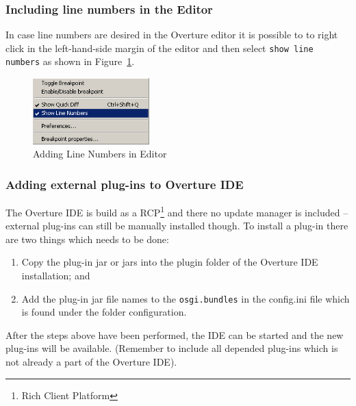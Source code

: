 \documentclass{overturerepsec}
\begin{document}
\subsubsection{Including line numbers in the Editor}

In case line numbers are desired in the Overture
editor it is possible to to right click in the left-hand-side margin
of the editor and then select \texttt{show line numbers} as shown in
Figure~\ref{fig:linenumbers}. 

\begin{figure}[!htb]
\begin{center}
\includegraphics[width=0.4\textwidth]{screenDumps/linenumbers}
\caption{Adding Line Numbers in Editor\label{fig:linenumbers}}
\end{center}
\end{figure}

\subsubsection{Adding external plug-ins to Overture IDE}

The Overture IDE is build as a RCP\footnote{Rich Client Platform} and
there no update manager is included -- external plug-ins can
still be manually installed though. To install a plug-in there are two
things which needs to be done:
\begin{enumerate}
\item Copy the plug-in jar or jars into the plugin folder of the Overture IDE installation; and
\item Add the plug-in jar file names to the \texttt{osgi.bundles} in the config.ini file which is found under the folder configuration.
\end{enumerate}

After the steps above have been performed, the IDE can be started and the new plug-ins will be available. (Remember to include all depended plug-ins which is not already a part of the Overture IDE).
\end{document}
